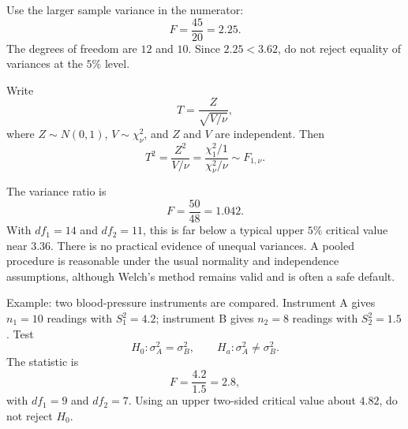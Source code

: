 \begin{solproblema}[prob:b47df2a]
Use the larger sample variance in the numerator:
\[
	F=\frac{45}{20}=2.25.
\]
The degrees of freedom are $12$ and $10$. Since $2.25<3.62$, do not reject equality of variances at the $5\%$ level.
\end{solproblema}

\begin{solproblema}[prob:23d903e]
Write
\[
	T=\frac{Z}{\sqrt{V/\nu}},
\]
where $Z\sim N(0,1)$, $V\sim\chi^2_\nu$, and $Z$ and $V$ are independent. Then
\[
	T^2=\frac{Z^2}{V/\nu}=\frac{\chi^2_1/1}{\chi^2_\nu/\nu}\sim F_{1,\nu}.
\]
\end{solproblema}

\begin{solproblema}[prob:e04a795]
The variance ratio is
\[
	F=\frac{50}{48}=1.042.
\]
With $df_1=14$ and $df_2=11$, this is far below a typical upper $5\%$ critical value near $3.36$. There is no practical evidence of unequal variances. A pooled procedure is reasonable under the usual normality and independence assumptions, although Welch's method remains valid and is often a safe default.
\end{solproblema}

\begin{solproblema}[prob:6277cc2]
Example: two blood-pressure instruments are compared. Instrument A gives $n_1=10$ readings with $S_1^2=4.2$; instrument B gives $n_2=8$ readings with $S_2^2=1.5$. Test
\[
	H_0:\sigma_A^2=\sigma_B^2,\qquad H_a:\sigma_A^2\ne\sigma_B^2.
\]
The statistic is
\[
	F=\frac{4.2}{1.5}=2.8,
\]
with $df_1=9$ and $df_2=7$. Using an upper two-sided critical value about $4.82$, do not reject $H_0$.
\end{solproblema}
